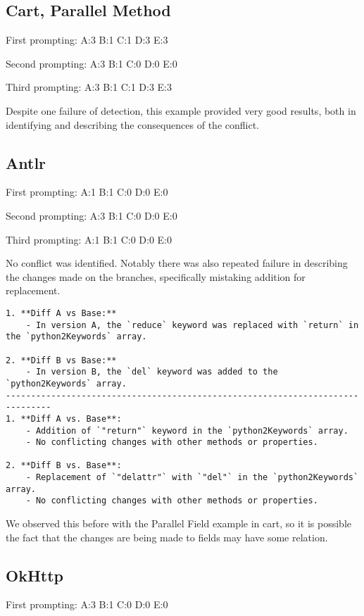 \subsection{Cart, Parallel Method}

First prompting:
A:3
B:1
C:1
D:3
E:3

Second prompting:
A:3
B:1
C:0
D:0
E:0

Third prompting:
A:3
B:1
C:1
D:3
E:3

Despite one failure of detection, this example provided very good results, both in identifying and describing the consequences of the conflict.

\subsection{Antlr}

First prompting:
A:1
B:1
C:0
D:0
E:0

Second prompting:
A:3
B:1
C:0
D:0
E:0

Third prompting:
A:1
B:1
C:0
D:0
E:0

No conflict was identified. Notably there was also repeated failure in describing the changes made on the branches, specifically mistaking addition for replacement.
\begin{lstlisting}
1. **Diff A vs Base:**
    - In version A, the `reduce` keyword was replaced with `return` in the `python2Keywords` array.
 
2. **Diff B vs Base:**
    - In version B, the `del` keyword was added to the `python2Keywords` array.
-------------------------------------------------------------------------------
1. **Diff A vs. Base**:
    - Addition of `"return"` keyword in the `python2Keywords` array.
    - No conflicting changes with other methods or properties.
 
2. **Diff B vs. Base**:
    - Replacement of `"delattr"` with `"del"` in the `python2Keywords` array.
    - No conflicting changes with other methods or properties.
\end{lstlisting}
We observed this before with the Parallel Field example in cart, so it is possible the fact that the changes are being made to fields may have some relation.

\subsection{OkHttp}

First prompting:
A:3
B:1
C:0
D:0
E:0

